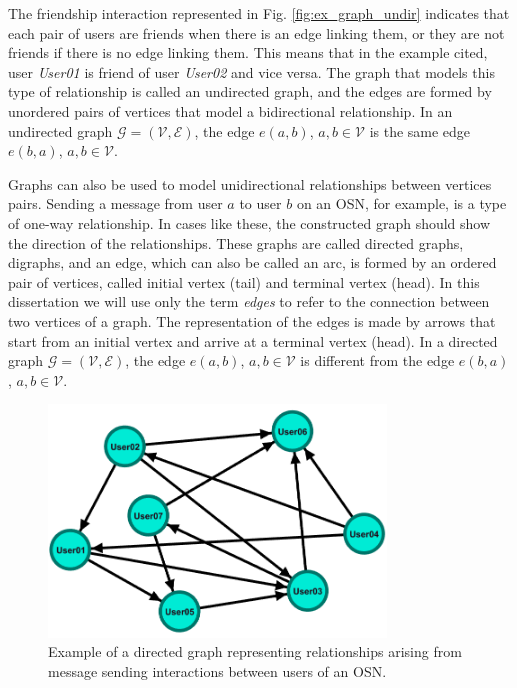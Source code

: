 The friendship interaction represented in Fig. \ref{fig:ex_graph_undir} indicates that each pair of users are friends when there is an edge linking them, or they are not friends if there is no edge linking them. This means that in the example cited, user {\em User01} is friend of user {\em User02} and vice versa. The graph that models this type of relationship is called an undirected graph, and the edges are formed by unordered pairs of vertices that model a bidirectional relationship. In an undirected graph $\mathcal{G} = (\mathcal{V}, \mathcal{E})$, the edge $e(a,b)$, $a, b \in \mathcal{V}$ is the same edge $e(b,a)$, $a, b \in \mathcal{V}$.

Graphs can also be used to model unidirectional relationships between vertices pairs. Sending a message from user $a$ to user $b$ on an OSN, for example, is a type of one-way relationship. In cases like these, the constructed graph should show the direction of the relationships. These graphs are called directed graphs, digraphs, and an edge, which can also be called an arc, is formed by an ordered pair of vertices, called initial vertex (tail) and terminal vertex (head). In this dissertation we will use only the term {\em edges} to refer to the connection between two vertices of a graph. The representation of the edges is made by arrows that start from an initial vertex and arrive at a terminal vertex (head). In a directed graph $\mathcal{G} = (\mathcal{V}, \mathcal{E})$, the edge $e(a,b)$, $a, b \in \mathcal{V}$ is different from the edge $e(b,a)$, $ a, b \in \mathcal{V}$.

\begin{figure}[htb]
	\centering
	\includegraphics[width=0.8\textwidth]{fig/intro/ex_graph_dir.png}
	\caption{Example of a directed graph representing relationships arising from message sending interactions between users of an OSN.}
	\label{fig:ex_graph_dir}
\end{figure}

